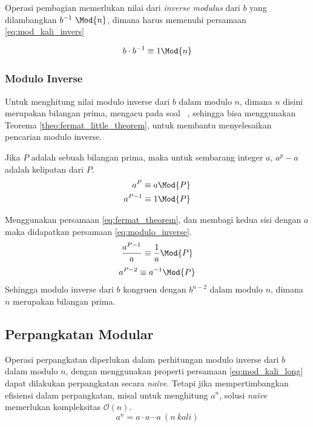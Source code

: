 \begin{enumerate}
	Operasi pembagian memerlukan nilai dari \textit{inverse modulus} dari $ b $ yang dilambangkan $ b^{-1}\ \Mod{n} $, dimana harus memenuhi persamaan \eqref{eq:mod_kali_invers}

	\begin{equation}
		b \cdot b^{-1} \equiv 1 \Mod{n}
		\label{eq:mod_kali_invers}
	\end{equation}

\end{enumerate}

\subsubsection{Modulo Inverse}
Untuk menghitung nilai modulo inverse dari $ b $ dalam modulo $ n $, dimana $ n $ disini merupakan bilangan prima, mengacu pada soal \nomorsoal\ \soal, sehingga bisa menggunakan Teorema \ref{theo:fermat_little_theorem}, untuk membantu menyelesaikan pencarian modulo inverse.

\begin{theo}
	\label{theo:fermat_little_theorem}
	Jika $ P $ adalah sebuah bilangan prima, maka untuk sembarang integer $ a $, $ a^p - a $ adalah kelipatan dari $ P $.
	\begin{equation}
		\begin{aligned}
			a^{P} \equiv a \Mod{P} \\
			a^{P-1} \equiv 1 \Mod{P} \\
		\end{aligned}
		\label{eq:fermat_theorem}
	\end{equation}
\end{theo}
Menggunakan persamaan \eqref{eq:fermat_theorem}, dan membagi kedua sisi dengan $ a $ maka didapatkan persamaan \eqref{eq:modulo_inverse}.
$$ \frac{a^{P-1}}{a} \equiv \frac{1}{a} \Mod{P} \\ $$
\begin{equation}
	a^{P-2} \equiv a^{-1} \Mod{P} \\
	\label{eq:modulo_inverse}
\end{equation}
Sehingga modulo inverse dari $ b $ kongruen dengan $ b^{n-2} $ dalam modulo $ n $, dimana $ n $ merupakan bilangan prima.

\subsection{Perpangkatan Modular}
Operasi perpangkatan diperlukan dalam perhitungan modulo inverse dari $ b $ dalam modulo $ n $, dengan menggunakan properti persamaan \eqref{eq:mod_kali_long} dapat dilakukan perpangkatan secara \textit{na\"ive}. Tetapi jika mempertimbangkan efisiensi dalam perpangkatan, misal untuk menghitung $ a^n $, solusi \textit{na\"ive} memerlukan kompleksitas $ \mathcal{O}{(n)} $.
$$ a^n = a \cdot a \cdots a\ (n\ kali) $$

